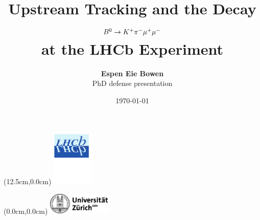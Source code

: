 \documentclass[aspectratio=1610]{beamer}
\begin{document}
\title[]{Upstream Tracking and the Decay ${B}^{0} \rightarrow K^{+}\pi^{-}\mu^{+}\mu^{-}$\\ at the LHCb Experiment}
\author[Espen Eie Bowen]{{\bf Espen Eie Bowen} \\ {\small PhD defense presentation}} 
\institute[]{}
\date{\today}
\begin{frame}[plain]
\titlepage
\begin{textblock*}{2cm}(12.5cm,0.0cm)
  \includegraphics[width=2cm]{figs/lhcb-logo.pdf}
\end{textblock*}
\begin{textblock*}{5cm}(0.0cm,0.0cm)
  \includegraphics[width=3.0cm]{figs/uzh.jpg}
\end{textblock*}
\end{frame}

  

\begin{frame}{}

\end{frame}


\end{document}
